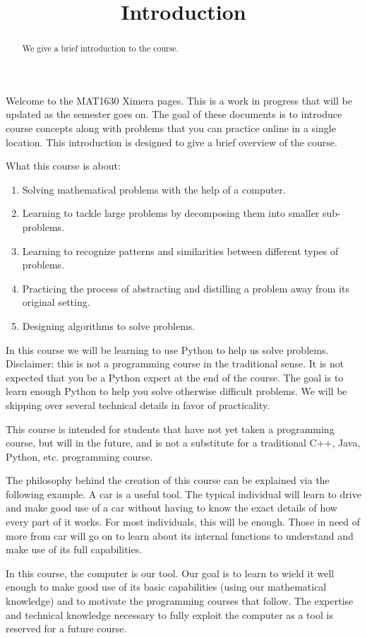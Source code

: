 \documentclass{ximera}
\title{Introduction}
\begin{document}
  
\begin{abstract}  
We give a brief introduction to the course.
\end{abstract}  
\maketitle

Welcome to the MAT1630 Ximera pages. This is a work in progress that will be updated as the semester goes on. The goal of these documents is to introduce course concepts along with problems that you can practice online in a single location. 
This introduction is designed to give a brief overview of the course.

What this course is about:

\begin{enumerate}
	\item Solving mathematical problems with the help of a computer.
	\item Learning to tackle large problems by decomposing them into smaller sub-problems.
	\item Learning to recognize patterns and similarities between different types of problems.
	\item Practicing the process of abstracting and distilling a problem away from its original setting.
	\item Designing algorithms to solve problems.
\end{enumerate}

In this course we will be learning to use Python to help us solve problems. Disclaimer: this is not a programming course in the traditional sense. It is not expected that you be a Python expert at the end of the course. The goal is to learn enough Python to help you solve otherwise difficult problems. We will be skipping over several technical details in favor of practicality. 

This course is intended for students that have not yet taken a programming course, but will in the future, and is not a substitute for a traditional C++, Java, Python, etc. programming course. 

The philosophy behind the creation of this course can be explained via the following example. A car is a useful tool. The typical individual will learn to drive and make good use of a car without having to know the exact details of how every part of it works. For most individuals, this will be enough. Those in need of more from car will go on to learn about its internal functions to understand and make use of its full capabilities. 

In this course, the computer is our tool. Our goal is to learn to wield it well enough to make good use of its basic capabilities (using our mathematical knowledge) and to motivate the programming courses that follow. The expertise and technical knowledge necessary to fully exploit the computer as a tool is reserved for a future course. 
\end{document}
